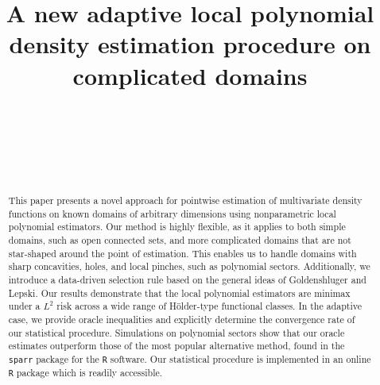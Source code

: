 \documentclass[bj,authoryear]{imsart}
\numberwithin{equation}{section}
\theoremstyle{plain}
\theoremstyle{remark}
\newcommand{\1}{\mathds{1}}
\begin{document}
\begin{frontmatter}
\title{A new adaptive local polynomial density estimation procedure on complicated domains}

\begin{aug}
\author[a1]{~}
\author[a2]{~}
\author[a3,a4]{~} %
\address[a1]{CIMFAV-INGEMAT, Universidad de Valpa{r}a\'{\i}so, Valpara\'iso, Chile}
\address[a2]{Univ Rennes, CNRS, IRMAR-UMR 6625, F-35000 Rennes, France}
\address[a3]{Centre de recherches math\'ematiques, Universit\'e de Montr\'eal, Montreal, Canada}
\address[a4]{Department of Mathematics and Statistics, McGill University, Montreal, Canada}
\end{aug}

\begin{abstract}
This paper presents a novel approach for pointwise estimation of multivariate density functions on known domains of arbitrary dimensions using nonparametric local polynomial estimators. Our method is highly flexible, as it applies to both simple domains, such as open connected sets, and more complicated domains that are not star-shaped around the point of estimation. This enables us to handle domains with sharp concavities, holes, and local pinches, such as polynomial sectors. Additionally, we introduce a data-driven selection rule based on the general ideas of Goldenshluger and Lepski. Our results demonstrate that the local polynomial estimators are minimax under a $L^2$ risk across a wide range of H\"older-type functional classes. In the adaptive case, we provide oracle inequalities and explicitly determine the convergence rate of our statistical procedure. Simulations on polynomial sectors show that our oracle estimates outperform those of the most popular alternative method, found in the \texttt{sparr} package for the \texttt{R} software. Our statistical procedure is implemented in an online \texttt{R} package which is readily accessible.
\end{abstract}


\end{frontmatter}
\end{document}
